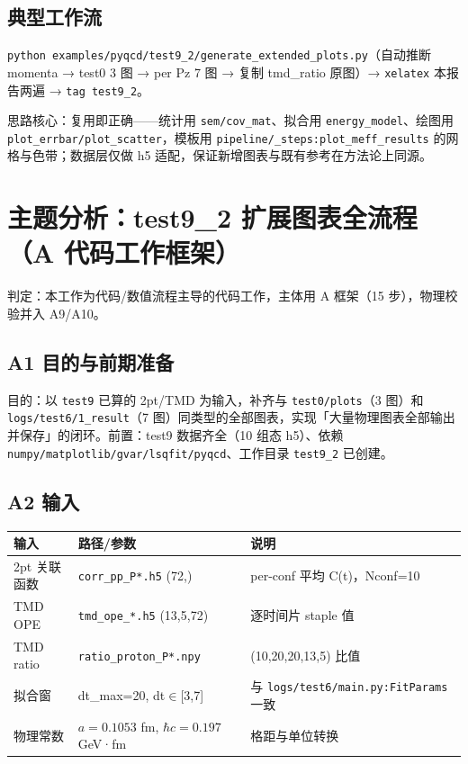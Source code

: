 \documentclass[UTF8]{ctexart}
\begin{document}
\subsection{典型工作流}
\texttt{python examples/pyqcd/test9\_2/generate\_extended\_plots.py}（自动推断 momenta → test0 3 图 → per Pz 7 图 → 复制 tmd\_ratio 原图）→ \texttt{xelatex} 本报告两遍 → \texttt{tag test9\_2}。

\begin{ideabox}
思路核心：复用即正确——统计用 \texttt{sem/cov\_mat}、拟合用 \texttt{energy\_model}、绘图用 \texttt{plot\_errbar/plot\_scatter}，模板用 \texttt{pipeline/\_steps:plot\_meff\_results} 的网格与色带；数据层仅做 h5 适配，保证新增图表与既有参考在方法论上同源。
\end{ideabox}

\section{主题分析：test9\_2 扩展图表全流程（A 代码工作框架）}
判定：本工作为代码/数值流程主导的代码工作，主体用 A 框架（15 步），物理校验并入 A9/A10。

\subsection{A1 目的与前期准备}
目的：以 \texttt{test9} 已算的 2pt/TMD 为输入，补齐与 \texttt{test0/plots}（3 图）和 \texttt{\nolinkurl{logs/test6/1\_result}}（7 图）同类型的全部图表，实现「大量物理图表全部输出并保存」的闭环。前置：test9 数据齐全（10 组态 h5）、依赖 \texttt{numpy/matplotlib/gvar/lsqfit/pyqcd}、工作目录 \texttt{test9\_2} 已创建。

\subsection{A2 输入}
\begin{xltabular}{\textwidth}{lXX}
\toprule
输入 & 路径/参数 & 说明 \\
\midrule
\endhead
2pt 关联函数 & \texttt{\nolinkurl{corr\_pp\_P*.h5}} (72,) & per-conf 平均 C(t)，Nconf=10 \\
TMD OPE & \texttt{\nolinkurl{tmd\_ope\_*.h5}} (13,5,72) & 逐时间片 staple 值 \\
TMD ratio & \texttt{\nolinkurl{ratio\_proton\_P*.npy}} & (10,20,20,13,5) 比值 \\
拟合窗 & dt\_max=20, dt$\in$[3,7] & 与 \texttt{\nolinkurl{logs/test6/main.py:FitParams}} 一致 \\
物理常数 & $a=0.1053$ fm, $\hbar c=0.197$ GeV·fm & 格距与单位转换 \\
\bottomrule
\end{xltabular}
\end{document}
